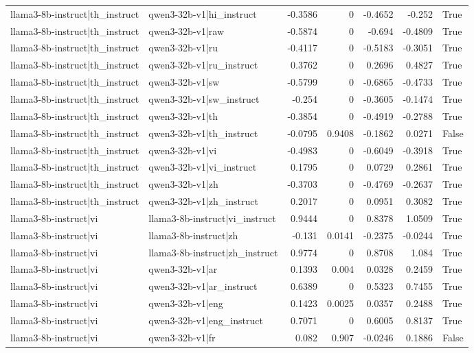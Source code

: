 \begin{table}
\begin{tabular}{l l r r r r l}
llama3-8b-instruct|th_instruct & qwen3-32b-v1|hi_instruct & -0.3586 & 0 & -0.4652 & -0.252 & True \\
llama3-8b-instruct|th_instruct & qwen3-32b-v1|raw & -0.5874 & 0 & -0.694 & -0.4809 & True \\
llama3-8b-instruct|th_instruct & qwen3-32b-v1|ru & -0.4117 & 0 & -0.5183 & -0.3051 & True \\
llama3-8b-instruct|th_instruct & qwen3-32b-v1|ru_instruct & 0.3762 & 0 & 0.2696 & 0.4827 & True \\
llama3-8b-instruct|th_instruct & qwen3-32b-v1|sw & -0.5799 & 0 & -0.6865 & -0.4733 & True \\
llama3-8b-instruct|th_instruct & qwen3-32b-v1|sw_instruct & -0.254 & 0 & -0.3605 & -0.1474 & True \\
llama3-8b-instruct|th_instruct & qwen3-32b-v1|th & -0.3854 & 0 & -0.4919 & -0.2788 & True \\
llama3-8b-instruct|th_instruct & qwen3-32b-v1|th_instruct & -0.0795 & 0.9408 & -0.1862 & 0.0271 & False \\
llama3-8b-instruct|th_instruct & qwen3-32b-v1|vi & -0.4983 & 0 & -0.6049 & -0.3918 & True \\
llama3-8b-instruct|th_instruct & qwen3-32b-v1|vi_instruct & 0.1795 & 0 & 0.0729 & 0.2861 & True \\
llama3-8b-instruct|th_instruct & qwen3-32b-v1|zh & -0.3703 & 0 & -0.4769 & -0.2637 & True \\
llama3-8b-instruct|th_instruct & qwen3-32b-v1|zh_instruct & 0.2017 & 0 & 0.0951 & 0.3082 & True \\
llama3-8b-instruct|vi & llama3-8b-instruct|vi_instruct & 0.9444 & 0 & 0.8378 & 1.0509 & True \\
llama3-8b-instruct|vi & llama3-8b-instruct|zh & -0.131 & 0.0141 & -0.2375 & -0.0244 & True \\
llama3-8b-instruct|vi & llama3-8b-instruct|zh_instruct & 0.9774 & 0 & 0.8708 & 1.084 & True \\
llama3-8b-instruct|vi & qwen3-32b-v1|ar & 0.1393 & 0.004 & 0.0328 & 0.2459 & True \\
llama3-8b-instruct|vi & qwen3-32b-v1|ar_instruct & 0.6389 & 0 & 0.5323 & 0.7455 & True \\
llama3-8b-instruct|vi & qwen3-32b-v1|eng & 0.1423 & 0.0025 & 0.0357 & 0.2488 & True \\
llama3-8b-instruct|vi & qwen3-32b-v1|eng_instruct & 0.7071 & 0 & 0.6005 & 0.8137 & True \\
llama3-8b-instruct|vi & qwen3-32b-v1|fr & 0.082 & 0.907 & -0.0246 & 0.1886 & False \\

\end{tabular}
\end{table}
